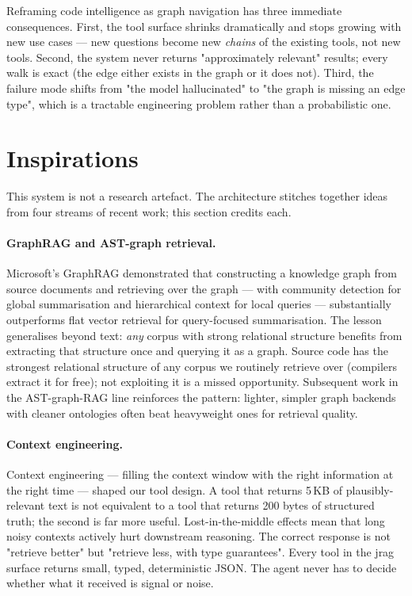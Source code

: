 \documentclass[11pt,a4paper]{article}
\begin{document}
Reframing code intelligence as graph navigation has three immediate consequences. First, the tool surface shrinks dramatically and stops growing with new use cases --- new questions become new \emph{chains} of the existing tools, not new tools. Second, the system never returns "approximately relevant" results; every walk is exact (the edge either exists in the graph or it does not). Third, the failure mode shifts from "the model hallucinated" to "the graph is missing an edge type", which is a tractable engineering problem rather than a probabilistic one.

\section{Inspirations}
\label{sec:inspirations}

This system is not a research artefact. The architecture stitches together ideas from four streams of recent work; this section credits each.

\paragraph{GraphRAG and AST-graph retrieval.} Microsoft's GraphRAG \cite{edge2024graphrag} demonstrated that constructing a knowledge graph from source documents and retrieving over the graph --- with community detection for global summarisation and hierarchical context for local queries --- substantially outperforms flat vector retrieval for query-focused summarisation. The lesson generalises beyond text: \emph{any} corpus with strong relational structure benefits from extracting that structure once and querying it as a graph. Source code has the strongest relational structure of any corpus we routinely retrieve over (compilers extract it for free); not exploiting it is a missed opportunity. Subsequent work in the AST-graph-RAG line \cite{guo2024lightrag} reinforces the pattern: lighter, simpler graph backends with cleaner ontologies often beat heavyweight ones for retrieval quality.

\paragraph{Context engineering.} Context engineering --- filling the context window with the right information at the right time --- shaped our tool design. A tool that returns 5\,KB of plausibly-relevant text is not equivalent to a tool that returns 200 bytes of structured truth; the second is far more useful. Lost-in-the-middle effects \cite{liu2023lostmiddle} mean that long noisy contexts actively hurt downstream reasoning. The correct response is not "retrieve better" but "retrieve less, with type guarantees". Every tool in the jrag surface returns small, typed, deterministic JSON. The agent never has to decide whether what it received is signal or noise.
\end{document}
